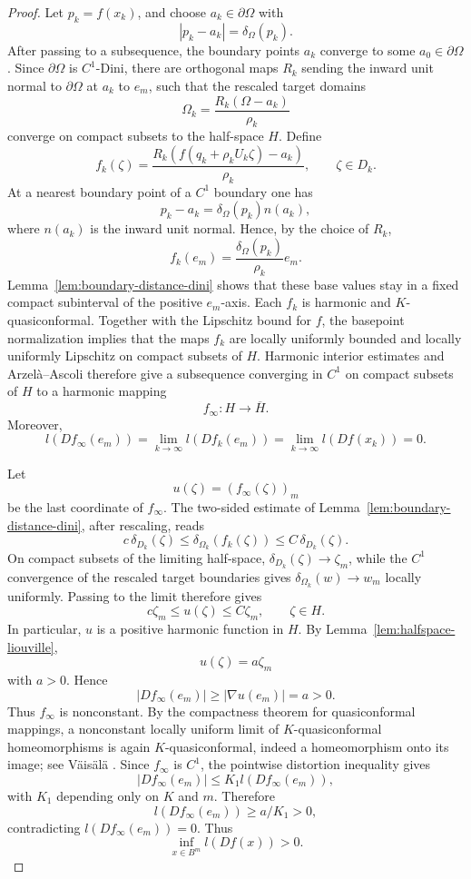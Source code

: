 \documentclass[11pt]{amsart}
\theoremstyle{definition}
\theoremstyle{remark}
\begin{document}
\begin{proof}
Let \(p_k=f(x_k)\), and choose \(a_k\in\partial\Omega\) with
\[
        |p_k-a_k|=\delta_\Omega(p_k).
\]
After passing to a subsequence, the boundary points \(a_k\) converge to
some \(a_0\in\partial\Omega\).  Since \(\partial\Omega\) is \(C^1\)-Dini,
there are orthogonal maps \(R_k\) sending the inward unit normal to
\(\partial\Omega\) at \(a_k\) to \(e_m\), such that the rescaled target
domains
\[
        \Omega_k=\frac{R_k(\Omega-a_k)}{\rho_k}
\]
converge on compact subsets to the half-space \(H\).  Define
\[
        f_k(\zeta)=
        \frac{R_k(f(q_k+\rho_kU_k\zeta)-a_k)}{\rho_k},
        \qquad \zeta\in D_k.
\]
At a nearest boundary point of a \(C^1\) boundary one has
\[
        p_k-a_k=\delta_\Omega(p_k)n(a_k),
\]
where \(n(a_k)\) is the inward unit normal. Hence, by the choice of
\(R_k\),
\[
        f_k(e_m)=\frac{\delta_\Omega(p_k)}{\rho_k}e_m.
\]
Lemma~\ref{lem:boundary-distance-dini} shows that these base values stay
in a fixed compact subinterval of the positive \(e_m\)-axis. Each
\(f_k\) is harmonic and \(K\)-quasiconformal. Together with the
Lipschitz bound for \(f\), the basepoint normalization implies that the
maps \(f_k\) are locally uniformly bounded and locally uniformly
Lipschitz on compact subsets of \(H\).
Harmonic interior estimates and Arzel\`a--Ascoli therefore give a
subsequence converging in \(C^1\) on compact subsets of \(H\) to a
harmonic mapping
\[
        f_\infty:H\to \overline H.
\]
Moreover,
\[
        l(Df_\infty(e_m))=
        \lim_{k\to\infty} l(Df_k(e_m))
        =
        \lim_{k\to\infty} l(Df(x_k))=0.
\]

Let
\[
        u(\zeta)=(f_\infty(\zeta))_m
\]
be the last coordinate of \(f_\infty\).  The two-sided estimate of
Lemma~\ref{lem:boundary-distance-dini}, after rescaling, reads
\[
        c\,\delta_{D_k}(\zeta)
        \le \delta_{\Omega_k}(f_k(\zeta))
        \le C\,\delta_{D_k}(\zeta).
\]
On compact subsets of the limiting half-space,
\(\delta_{D_k}(\zeta)\to\zeta_m\), while the \(C^1\) convergence of the
rescaled target boundaries gives
\(\delta_{\Omega_k}(w)\to w_m\) locally uniformly. Passing to the limit
therefore gives
\[
        c\zeta_m\le u(\zeta)\le C\zeta_m,
        \qquad \zeta\in H.
\]
In particular, \(u\) is a positive harmonic function in \(H\).  By
Lemma~\ref{lem:halfspace-liouville},
\[
        u(\zeta)=a\zeta_m
\]
with \(a>0\).  Hence
\[
        |Df_\infty(e_m)|\ge |\nabla u(e_m)|=a>0.
\]
Thus \(f_\infty\) is nonconstant. By the compactness theorem for
quasiconformal mappings, a nonconstant locally uniform limit of
\(K\)-quasiconformal homeomorphisms is again \(K\)-quasiconformal, indeed a
homeomorphism onto its image; see V\"ais\"al\"a \cite{Vaisala1971}. Since
\(f_\infty\) is \(C^1\), the pointwise distortion inequality gives
\[
        |Df_\infty(e_m)|\le K_1 l(Df_\infty(e_m)),
\]
with \(K_1\) depending only on \(K\) and \(m\).  Therefore
\[
        l(Df_\infty(e_m))\ge a/K_1>0,
\]
contradicting \(l(Df_\infty(e_m))=0\).  Thus
\[
        \inf_{x\in B^m}l(Df(x))>0.
\]


\end{proof}
\end{document}
